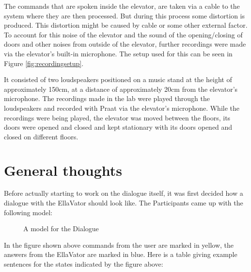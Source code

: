 \documentclass[a4paper, 12pt]{article}
\begin{document}
The commands that are spoken inside the elevator, are taken via a cable to the system where they are then processed. But during this process some distortion is produced. This distortion might be caused by cable or some other external factor. To account for this noise of the elevator and the sound of the opening/closing of doors and other noises from outside of the elevator, further recordings were made via the elevator's built-in microphone. The setup used for this can be seen in Figure \ref{fig:recordingsetup}.

It consisted of two loudspeakers positioned on a music stand at the height of approximately 150cm, at a distance of approximately 20cm from the elevator's microphone.
The recordings made in the lab were played through the loudspeakers and recorded with Praat via the elevator's microphone.
While the recordings were being played, the elevator was moved between the floors, its doors were opened and closed and kept stationary with its doors opened and closed on different floors.

\newpage
\section{General thoughts}
\label{sec:General_thoughts}
Before actually starting to work on the dialogue itself, it was first decided how a dialogue with the EllaVator 
should look like. The Participants came up with the following model: \\ 

\begin{figure} [ht]
  \caption{A model for the Dialogue}
  \label{fig: Dialogue flow}
\end{figure}

In the figure shown above commands from the user are marked in yellow, the answers from the EllaVator are marked in blue.
Here is a table giving example sentences for the states indicated by the figure above: \\
\end{document}

